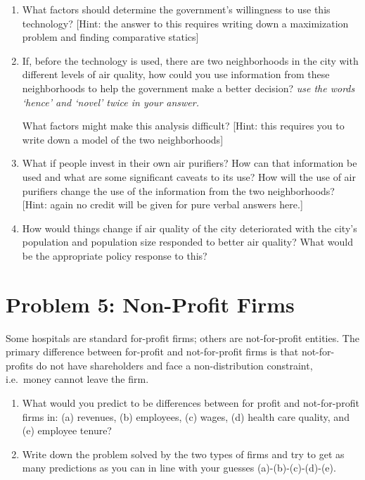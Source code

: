\documentclass[11pt,a4paper]{article}
\begin{document}
\begin{enumerate}
    \item What factors should determine the government's willingness to use this technology? [Hint: the answer to this requires writing down a maximization problem and finding comparative statics]

    \item If, before the technology is used, there are two neighborhoods in the city with different levels of air quality, how could you use information from these neighborhoods to help the government make a better decision? \emph{use the words `hence' and `novel' twice in your answer.}

    What factors might make this analysis difficult? [Hint: this requires you to write down a model of the two neighborhoods]

    \item What if people invest in their own air purifiers? How can that information be used and what are some significant caveats to its use? How will the use of air purifiers change the use of the information from the two neighborhoods? [Hint: again no credit will be given for pure verbal answers here.]

    \item How would things change if air quality of the city deteriorated with the city's population and population size responded to better air quality? What would be the appropriate policy response to this?
\end{enumerate}

\section*{Problem 5: Non-Profit Firms}

Some hospitals are standard for-profit firms; others are not-for-profit entities. The primary difference between for-profit and not-for-profit firms is that not-for-profits do not have shareholders and face a non-distribution constraint, i.e.\ money cannot leave the firm.

\begin{enumerate}
    \item What would you predict to be differences between for profit and not-for-profit firms in: (a) revenues, (b) employees, (c) wages, (d) health care quality, and (e) employee tenure?

    \item Write down the problem solved by the two types of firms and try to get as many predictions as you can in line with your guesses (a)-(b)-(c)-(d)-(e).
\end{enumerate}
\end{document}
